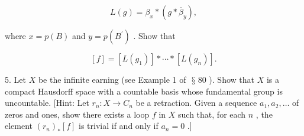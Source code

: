\documentclass[10pt]{article}
\begin{document}
\[
L\left( g\right)  = {\beta }_{x} * \left( {g * {\overline{\beta }}_{y}}\right) ,
\]

where \(x = p\left( B\right)\) and \(y = p\left( {B}^{\prime }\right)\) . Show that

\[
\left\lbrack  f\right\rbrack   = \left\lbrack  {L\left( {g}_{1}\right) }\right\rbrack   * \cdots  * \left\lbrack  {L\left( {g}_{n}\right) }\right\rbrack  .
\]

5. Let \(X\) be the infinite earning (see Example 1 of \(\text{ § }{80}\) ). Show that \(X\) is a compact Hausdorff space with a countable basis whose fundamental group is uncountable. [Hint: Let \({r}_{n} : X \rightarrow  {C}_{n}\) be a retraction. Given a sequence \({a}_{1},{a}_{2},\ldots\) of zeros and ones, show there exists a loop \(f\) in \(X\) such that, for each \(n\) , the element \({\left( {r}_{n}\right) }_{ * }\left\lbrack  f\right\rbrack\) is trivial if and only if \({a}_{n} = 0\) .]
\end{document}
